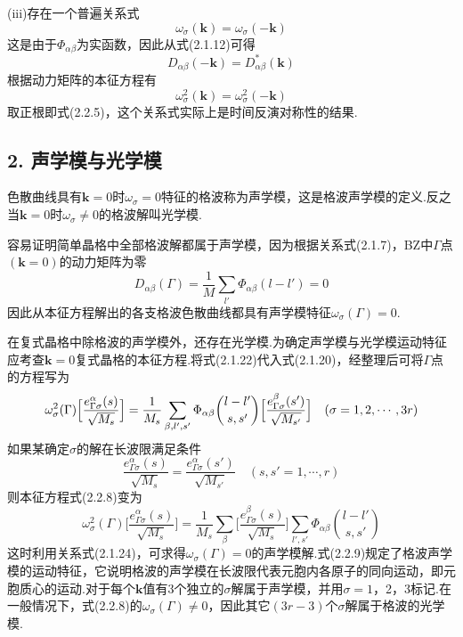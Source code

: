 (iii)存在一个普遍关系式
\begin{equation}
  \omega_{\sigma}(\boldsymbol{k})=\omega_{\sigma}(-\boldsymbol{k})
\end{equation}
这是由于$\Phi_{\alpha\beta}$为实函数，因此从式(2.1.12)可得
\begin{equation}
  D_{\alpha\beta}(-\boldsymbol{k})=D_{\alpha\beta}^{*}(\boldsymbol{k})
\end{equation}
根据动力矩阵的本征方程有
\begin{equation}
  \omega_{\sigma}^{2}(\boldsymbol{k})=\omega_{\sigma}^{2}(-\boldsymbol{k})
\end{equation}
取正根即式(2.2.5)，这个关系式实际上是时间反演对称性的结果.

\subsection*{2. 声学模与光学模}

色散曲线具有$\boldsymbol{k}=0$时$\omega_{\sigma}=0$特征的格波称为声学模，这是格波声学模的定义.反之当$\boldsymbol{k}=0$时$\omega_{\sigma}\neq0$的格波解叫光学模.

容易证明简单晶格中全部格波解都属于声学模，因为根据关系式(2.1.7)，BZ中$\Gamma$点$(\boldsymbol{k}=0)$的动力矩阵为零
\begin{equation*}
  D_{\alpha\beta}(\Gamma)=\frac{1}{M}\sum_{l'}\Phi_{\alpha\beta}(l-l')=0
\end{equation*}
因此从本征方程解出的各支格波色散曲线都具有声学模特征$\omega_{\sigma}(\Gamma)=0$.

在复式晶格中除格波的声学模外，还存在光学模.为确定声学模与光学模运动特征应考查$\boldsymbol{k}=0$复式晶格的本征方程.将式(2.1.22)代入式(2.1.20)，经整理后可将$\Gamma$点的方程写为
\begin{equation}
  \omega_{\sigma}^{2}(\Gamma)\Bigl[\frac{e_{\Gamma\sigma}^{\alpha}(s)}{\sqrt{M_s}}\Bigr]
  =\frac{1}{M_s}\sum_{\beta,l',s'}\Phi_{\alpha\beta}\binom{l-l'}{s,s'}
  \Bigl[\frac{e_{\Gamma\sigma}^{\beta}(s')}{\sqrt{M_{s'}}}\Bigr]
  \quad(\sigma=1,2,\cdots,3r)
\end{equation}
如果某确定$\sigma$的解在长波限满足条件
\begin{equation}
  \frac{e_{\Gamma\sigma}^{\alpha}(s)}{\sqrt{M_s}}
  =\frac{e_{\Gamma\sigma}^{\alpha}(s')}{\sqrt{M_{s'}}}
  \quad(s,s'=1,\cdots,r)
\end{equation}
则本征方程式(2.2.8)变为
\begin{equation}
  \omega_{\sigma}^{2}(\Gamma)\bigg[\frac{e_{\Gamma\sigma}^{\alpha}(s)}{\sqrt{M_s}}\bigg]
  =\frac{1}{M_s}\sum_{\beta}\bigg[\frac{e_{\Gamma\sigma}^{\beta}(s)}{\sqrt{M_s}}\bigg]
  \sum_{l',s'}\Phi_{\alpha\beta}\binom{l-l'}{s,s'}
\end{equation}
这时利用关系式(2.1.24)，可求得$\omega_{\sigma}(\Gamma)=0$的声学模解.式(2.2.9)规定了格波声学模的运动特征，它说明格波的声学模在长波限代表元胞内各原子的同向运动，即元胞质心的运动.对于每个$\boldsymbol{k}$值有3个独立的$\sigma$解属于声学模，并用$\sigma=1$，2，3标记.在一般情况下，式(2.2.8)的$\omega_{\sigma}(\Gamma)\neq0$，因此其它$(3r-3)$个$\sigma$解属于格波的光学模.

